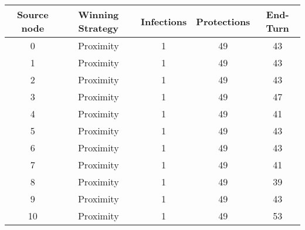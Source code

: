 \documentclass[results.tex]{subfiles}
\begin{document}
    \begin{center}
        \begin{tabular}{| c || c | c | c | c |}
            \hline
            {\bfseries Source node} & {\bfseries Winning Strategy} & {\bfseries Infections} & {\bfseries Protections}
            & {\bfseries End-Turn}
            \\  %
            \hline\hline
            0                       & Proximity                    & 1                      & 49                      & 43                   \\
            \hline
            1                       & Proximity                    & 1                      & 49                      & 43                   \\
            \hline
            2                       & Proximity                    & 1                      & 49                      & 43                   \\
            \hline
            3                       & Proximity                    & 1                      & 49                      & 47                   \\
            \hline
            4                       & Proximity                    & 1                      & 49                      & 41                   \\
            \hline
            5                       & Proximity                    & 1                      & 49                      & 43                   \\
            \hline
            6                       & Proximity                    & 1                      & 49                      & 43                   \\
            \hline
            7                       & Proximity                    & 1                      & 49                      & 41                   \\
            \hline
            8                       & Proximity                    & 1                      & 49                      & 39                   \\
            \hline
            9                       & Proximity                    & 1                      & 49                      & 43                   \\
            \hline
            10                      & Proximity                    & 1                      & 49                      & 53                   \\

\end{tabular}
\end{center}
\end{document}
